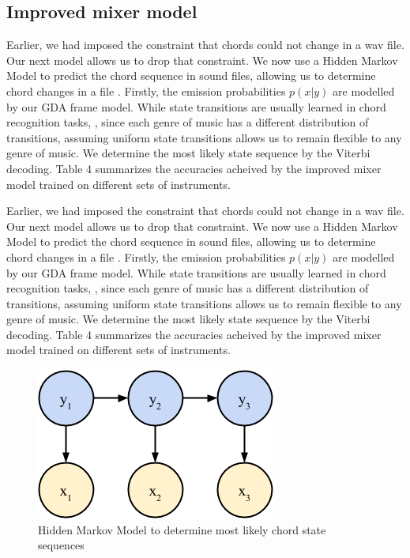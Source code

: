 \documentclass{article}
\begin{document}
\subsection{Improved mixer model}
Earlier, we had imposed the constraint that chords could not change in a wav file. Our next model allows us to drop that constraint. We now use a Hidden Markov Model to predict the chord sequence in sound files, allowing us to determine chord changes in a file \cite{sheh}. Firstly, the emission probabilities $p(x|y)$ are modelled by our GDA frame model. While state transitions are usually learned in chord recognition tasks, \cite{lee}, since each genre of music has a different distribution of transitions, assuming uniform state transitions allows us to remain flexible to any genre of music. We determine the most likely state sequence by the Viterbi decoding. Table 4 summarizes the accuracies acheived by the improved mixer model trained on different sets of instruments.

Earlier, we had imposed the constraint that chords could not change in a wav file. Our next model allows us to drop that constraint. We now use a Hidden Markov Model to predict the chord sequence in sound files, allowing us to determine chord changes in a file \cite{lee}. Firstly, the emission probabilities $p(x|y)$ are modelled by our GDA frame model. While state transitions are usually learned in chord recognition tasks, \cite{lee}, since each genre of music has a different distribution of transitions, assuming uniform state transitions allows us to remain flexible to any genre of music. We determine the most likely state sequence by the Viterbi decoding. Table 4 summarizes the accuracies acheived by the improved mixer model trained on different sets of instruments.

\begin{figure}[ht]
\vskip 0.2in
\begin{center}
\centerline{\includegraphics[width=\columnwidth]{hmm}}
\caption{Hidden Markov Model to determine most likely chord state sequences}
\label{icml-historical}
\end{center}
\vskip -0.2in
\end{figure}
\end{document}
